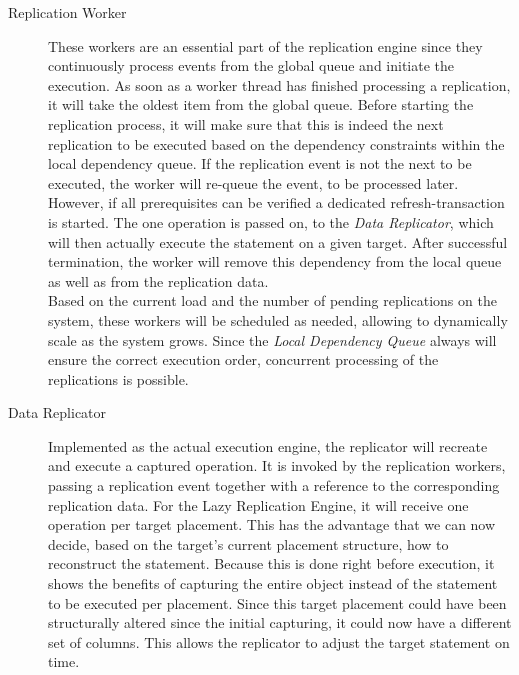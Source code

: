 \begin{description}
    \item[Replication Worker] These workers are an essential part of the replication engine since they continuously process events from the global queue 
    and initiate the execution. As soon as a worker thread has finished processing a replication, it will take the oldest item from the global queue. 
    Before starting the replication process, it will make sure that this is indeed the next replication to be executed based on the dependency constraints
    within the local dependency queue. If the replication event is not the next to be executed, the worker will re-queue the event, to be processed later.
    However, if all prerequisites can be verified a dedicated refresh-transaction is started.
    The one operation is passed on, to the \emph{Data Replicator}, which will then actually execute the statement on a given target.
    After successful termination, the worker will remove this dependency from the local queue as well as from the replication data. \\
    Based on the current load and the number of pending replications on the system, these workers will be scheduled as needed, allowing to dynamically scale as the system grows.
    Since the \emph{Local Dependency Queue} always will ensure the correct execution order, concurrent processing of the replications is possible.     
    


    \item[Data Replicator] Implemented as the actual execution engine, the replicator will recreate and execute a captured operation. 
    It is invoked by the replication workers, passing a replication event together with a reference to the corresponding replication data.
    For the Lazy Replication Engine, it will receive one operation per target placement. 
    This has the advantage that we can now decide, based on the target's current placement structure, how to reconstruct the statement. 
    Because this is done right before execution, it shows the benefits of capturing the entire object instead of the statement to be executed per placement. 
    Since this target placement could have been structurally altered since the initial capturing, it could now have a different set of columns. 
    This allows the replicator to adjust the target statement on time.
    
    




\end{description}
